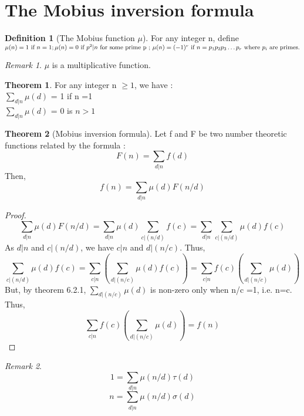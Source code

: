 \documentclass[15,a4paper]{report}
\theoremstyle{definition}
\newtheorem{definition}{Definition}[section]
\newtheorem{theorem}{Theorem}[section]
\theoremstyle{remark}
\newtheorem*{remark}{Remark}
\begin{document}
    \section{The Mobius inversion formula}
        \begin{definition}[The Mobius function $\mu$]
            For any integer n, define \\ $ \mu(n) = 1 \textrm{ if } n=1 ;~ \\ \mu(n) = 0 \textrm{ if } p^2|n\textrm{ for some prime p ; }\\ \mu(n) = (-1)^r \textrm{ if } n= p_1 p_2 p_3 \dots p_r\textrm{ where }p_i\textrm{ are primes.}$
        \end{definition}
        \begin{remark}
             $\mu$ is a multiplicative function.
        \end{remark}
        \begin{theorem}
            For any integer n $\geq 1$, we have :\\
            $\sum_{d|n} \mu(d)$ = 1 if n =1\\
            $\sum_{d|n} \mu(d)$ = 0 is $n >1$\\
        \end{theorem}
        \begin{theorem}[Mobius inversion formula]
            Let f and F be two number theoretic functions related by the formula :\[ F(n) = \sum_{d|n} f(d) \]
            Then, \[f(n) = \sum_{d|n} \mu(d) F(n/d) \]
        \end{theorem}
            \begin{proof}
                \[ \sum_{d|n} \mu(d) F(n/d) = \sum_{d|n} \mu(d) \sum_{c|(n/d)} f(c) = \sum_{d|n}  \sum_{c|(n/d)} \mu(d)f(c)\]
                As $d|n$ and $c|(n/d)$, we have $c|n$ and $d|(n/c)$. Thus, 
                \[  \sum_{c|(n/d)} \mu(d)f(c) = \sum_{c|n} (\sum_{d|(n/c)} \mu(d)f(c))  =  \sum_{c|n} f(c) (\sum_{d|(n/c)} \mu(d)) \]
                But, by theorem 6.2.1, $\sum_{d|(n/c)} \mu(d)$ is non-zero only when n/c =1, i.e. n=c. Thus, \[\sum_{c|n} f(c) (\sum_{d|(n/c)} \mu(d)) = f(n) \]
            \end{proof}
            \begin{remark}
                 \[ 1 = \sum_{d|n} \mu(n/d) \tau(d) \]
                 \[ n = \sum_{d|n} \mu(n/d) \sigma(d) \]
            \end{remark}
\end{document}
